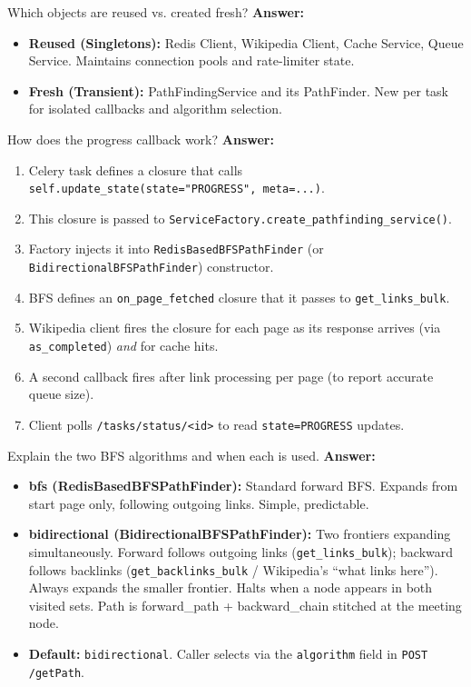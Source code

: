 \documentclass[11pt,a4paper]{article}
\begin{document}
\begin{qabox}{Which objects are reused vs. created fresh?}
\textbf{Answer:}
\begin{itemize}[leftmargin=*, nosep]
    \item \textbf{Reused (Singletons):} Redis Client, Wikipedia Client, Cache Service, Queue Service. Maintains connection pools and rate-limiter state.
    \item \textbf{Fresh (Transient):} PathFindingService and its PathFinder. New per task for isolated callbacks and algorithm selection.
\end{itemize}
\end{qabox}

\begin{qabox}{How does the progress callback work?}
\textbf{Answer:}
\begin{enumerate}[leftmargin=*, nosep]
    \item Celery task defines a closure that calls \texttt{self.update\_state(state="PROGRESS", meta=...)}.
    \item This closure is passed to \texttt{ServiceFactory.create\_pathfinding\_service()}.
    \item Factory injects it into \texttt{RedisBasedBFSPathFinder} (or \texttt{BidirectionalBFSPathFinder}) constructor.
    \item BFS defines an \texttt{on\_page\_fetched} closure that it passes to \texttt{get\_links\_bulk}.
    \item Wikipedia client fires the closure for each page as its response arrives (via \texttt{as\_completed}) \emph{and} for cache hits.
    \item A second callback fires after link processing per page (to report accurate queue size).
    \item Client polls \texttt{/tasks/status/<id>} to read \texttt{state=PROGRESS} updates.
\end{enumerate}
\end{qabox}

\begin{qabox}{Explain the two BFS algorithms and when each is used.}
\textbf{Answer:}
\begin{itemize}[leftmargin=*, nosep]
    \item \textbf{bfs (RedisBasedBFSPathFinder):} Standard forward BFS. Expands from start page only, following outgoing links. Simple, predictable.
    \item \textbf{bidirectional (BidirectionalBFSPathFinder):} Two frontiers expanding simultaneously. Forward follows outgoing links (\texttt{get\_links\_bulk}); backward follows backlinks (\texttt{get\_backlinks\_bulk} / Wikipedia's ``what links here''). Always expands the smaller frontier. Halts when a node appears in both visited sets. Path is forward\_path + backward\_chain stitched at the meeting node.
    \item \textbf{Default:} \texttt{bidirectional}. Caller selects via the \texttt{algorithm} field in \texttt{POST /getPath}.
\end{itemize}
\end{qabox}
\end{document}
